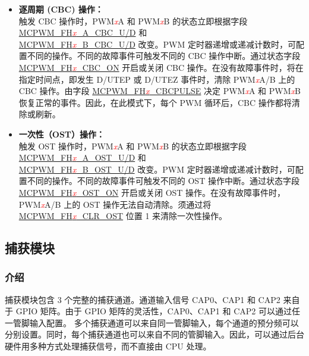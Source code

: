 \documentclass[main\_\_CN.tex]{subfiles}
\begin{document}
\begin{itemize}
    \item {\bfseries 逐周期 (CBC) 操作：}\\
    触发 CBC 操作时，PWM\textcolor{red}{\it{x}}A 和 PWM\textcolor{red}{\it{x}}B 的状态立即根据字段 \hyperref[fielddesc:MCPWMFH0ACBCU]{MCPWM\_FH\textcolor{red}{\it{x}}\_A\_CBC\_U/D} 和 \\\hyperref[fielddesc:MCPWMFH0BCBCU]{MCPWM\_FH\textcolor{red}{\it{x}}\_B\_CBC\_U/D} 改变。PWM 定时器递增或递减计数时，可配置不同的操作。不同的故障事件可触发不同的 CBC 操作中断。通过状态字段 \hyperref[fielddesc:MCPWMFH0CBCON]{MCPWM\_FH\textcolor{red}{\it{x}}\_CBC\_ON} 开启或关闭 CBC 操作。在没有故障事件时，将在指定时间点，即发生 D/UTEP 或 D/UTEZ 事件时，清除 PWM\textcolor{red}{\it{x}}A/B 上的 CBC 操作。由字段 \hyperref[fielddesc:MCPWMFH0CBCPULSE]{MCPWM\_FH\textcolor{red}{\it{x}}\_CBCPULSE} 决定 PWM\textcolor{red}{\it{x}}A 和 PWM\textcolor{red}{\it{x}}B 恢复正常的事件。因此，在此模式下，每个 PWM 循环后，CBC 操作都将清除或刷新。
    \item {\bfseries 一次性（OST）操作：}\\
	触发 OST 操作时，PWM\textcolor{red}{\it{x}}A 和 PWM\textcolor{red}{\it{x}}B 的状态立即根据字段 \hyperref[fielddesc:MCPWMFH0AOSTU]{MCPWM\_FH\textcolor{red}{\it{x}}\_A\_OST\_U/D} 和 \\\hyperref[fielddesc:MCPWMFH0BOSTU]{MCPWM\_FH\textcolor{red}{\it{x}}\_B\_OST\_U/D} 改变。PWM 定时器递增或递减计数时，可配置不同的操作。不同的故障事件可触发不同的 OST 操作中断。通过状态字段  \hyperref[fielddesc:MCPWMFH0OSTON]{MCPWM\_FH\textcolor{red}{\it{x}}\_OST\_ON} 开启或关闭 OST 操作。在没有故障事件时，PWM\textcolor{red}{\it{x}}A/B 上的 OST 操作无法自动清除。须通过将 \hyperref[fielddesc:MCPWMFH0CLROST]{MCPWM\_FH\textcolor{red}{\it{x}}\_CLR\_OST} 位置 1 来清除一次性操作。
\end{itemize}

\subsection{捕获模块}
\subsubsection{介绍}

捕获模块包含 3 个完整的捕获通道。通道输入信号 CAP0、CAP1 和 CAP2 来自于 GPIO 矩阵。由于 GPIO 矩阵的灵活性，CAP0、CAP1 和 CAP2 可以通过任一管脚输入配置。 多个捕获通道可以来自同一管脚输入，每个通道的预分频可以分别设置。同时，每个捕获通道也可以来自不同的管脚输入。因此，可以通过后台硬件用多种方式处理捕获信号，而不直接由 CPU 处理。
\end{document}

